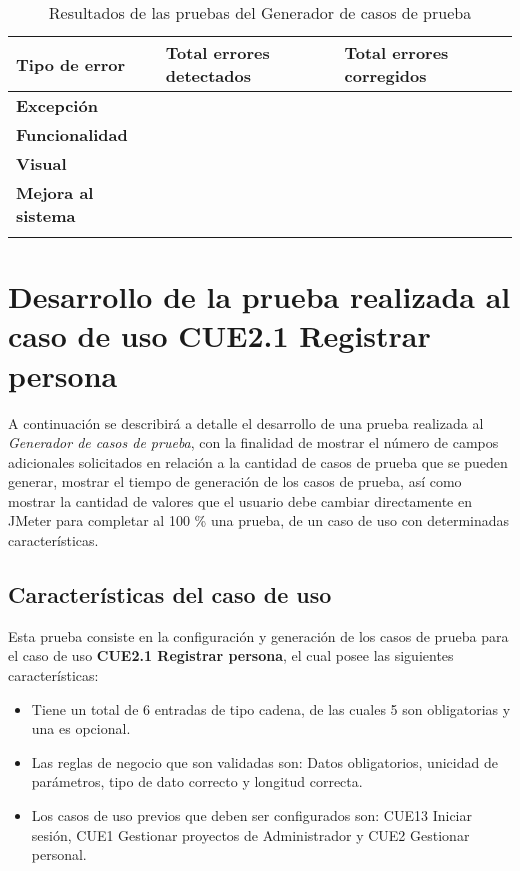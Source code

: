 \begin{longtable}{| p{} | p{} | p{} |}%
	\arrayrulecolor{black}%
	\rowcolor{black}%
	{\color{white}Tipo de error} & {\color{white}Total errores detectados} & {\color{white}Total errores corregidos}\\ \hline
	\endhead%
	\arrayrulecolor{black}%
	{\bf Excepción} & \porcentajeExcepcionGenerador & \porcentajeExcepcionCorregidosGenerador \\ \hline
	{\bf Funcionalidad} & \porcentajeFuncionalGenerador & \porcentajeFuncionalCorregidosGenerador \\ \hline
	{\bf Visual} & \porcentajeVisualGenerador & \porcentajeVisualCorregidosGenerador \\ \hline
	{\bf Mejora al sistema} & \porcentajeMejoraGenerador & \porcentajeMejoraCorregidosGenerador \\ \hline
	\caption{Resultados de las pruebas del Generador de casos de prueba}\label{tabla:erroresGenerador}
\end{longtable}

\section{Desarrollo de la prueba realizada al caso de uso CUE2.1 Registrar persona}

A continuación se describirá a detalle el desarrollo de una prueba realizada al {\it Generador de casos de prueba}, con la finalidad de mostrar el número de campos adicionales solicitados en relación
a la cantidad de casos de prueba que se pueden generar, mostrar el tiempo de generación de los casos de prueba, así como mostrar la cantidad de valores que el usuario debe cambiar 
directamente en JMeter para completar al 100 \% una prueba, de un caso de uso con determinadas características.\\

\subsection*{Características del caso de uso}
Esta prueba consiste en la configuración y 
generación de los casos de prueba para el caso de uso {\bf CUE2.1 Registrar persona}, el cual posee las siguientes características:

\begin{itemize}
 \item Tiene un total de 6 entradas de tipo cadena, de las cuales 5 son obligatorias y una es opcional.
 \item Las reglas de negocio que son validadas son: Datos obligatorios, unicidad de parámetros, tipo de dato correcto y longitud correcta.
 \item Los casos de uso previos que deben ser configurados son: CUE13 Iniciar sesión, CUE1 Gestionar proyectos de Administrador y CUE2 Gestionar personal.
\end{itemize}


